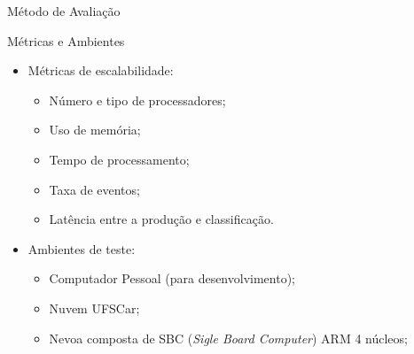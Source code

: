 \documentclass[aspectratio=43,10pt]{beamer}
\begin{document}
  

\begin{frame}[fragile]{Método de Avaliação}
  \begin{alertblock}{Métricas e Ambientes}
    \begin{itemize}
      \item Métricas de escalabilidade:
      \begin{itemize}
        \item Número e tipo de processadores;
        \item Uso de memória;
        \item Tempo de processamento;
        \item Taxa de eventos;
        \item Latência entre a produção e classificação.
      \end{itemize}
      \item Ambientes de teste:
      \begin{itemize}
        \item Computador Pessoal (para desenvolvimento);
        \item Nuvem UFSCar;
        \item Nevoa composta de SBC (\textit{Sigle Board Computer}) ARM 4 núcleos;
      \end{itemize}
    \end{itemize}
  \end{alertblock}
\end{frame}
\end{document}
